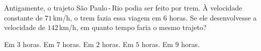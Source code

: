 Antigamente, o trajeto São Paulo\,-\,Rio podia ser feito por trem. À velocidade constante de $71$\,km/h, o trem fazia essa viagem em $6$ horas. Se ele desenvolvesse a velocidade de $142$\,km/h, em quanto tempo faria o mesmo trajeto?

Em $3$ horas.
Em $7$ horas.
Em $2$ horas.
Em $5$ horas.
Em $9$ horas.



